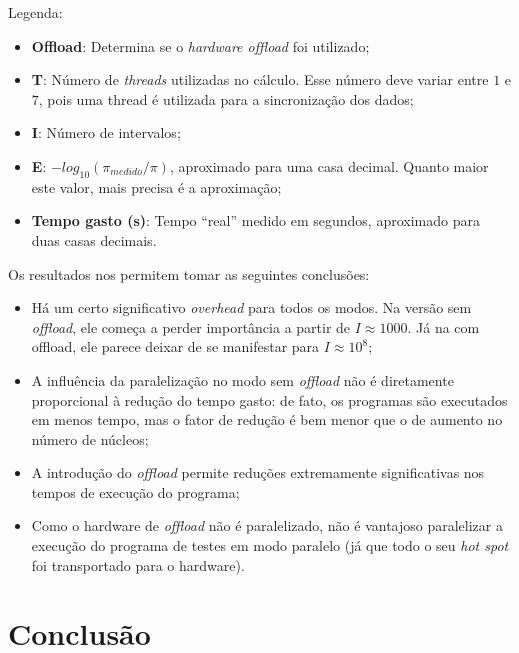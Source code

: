 \documentclass[11pt, a4paper]{article}
\begin{document}
Legenda:
\begin{itemize}
\item \textbf{Offload}: Determina se o \textit{hardware offload} foi utilizado; 
\item \textbf{T}: Número de \textit{threads} utilizadas no cálculo. Esse número deve variar entre $1$ e $7$, pois uma thread é utilizada para a sincronização dos dados;
\item \textbf{I}: Número de intervalos;
\item \textbf{E}: $-log_{10}(\pi_{medido}/\pi)$, aproximado para uma casa decimal. Quanto maior este valor, mais precisa é a aproximação;
\item \textbf{Tempo gasto (s)}: Tempo ``real'' medido em segundos, aproximado para duas casas decimais.
\end{itemize}

\clearpage

Os resultados nos permitem tomar as seguintes conclusões:

\begin{itemize}
\item Há um certo significativo \textit{overhead} para todos os modos. Na versão sem \textit{offload}, ele começa a perder importância a partir de $I \approx 1000$. Já na com offload, ele parece deixar de se manifestar para $I \approx 10^8$;
\item A influência da paralelização no modo sem \textit{offload} não é diretamente proporcional à redução do tempo gasto: de fato, os programas são executados em menos tempo, mas o fator de redução é bem menor que o de aumento no número de núcleos;
\item A introdução do \textit{offload} permite reduções extremamente significativas nos tempos de execução do programa;
\item Como o hardware de \textit{offload} não é paralelizado, não é vantajoso paralelizar a execução do programa de testes em modo paralelo (já que todo o seu \textit{hot spot} foi transportado para o hardware).
\end{itemize}

\section{Conclusão}
\end{document}
